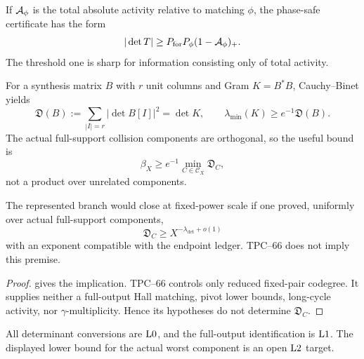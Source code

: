 If \(\mathcal A_\phi\) is the total absolute activity relative to matching
\(\phi\), the phase-safe certificate has the form
\begin{equation}
 |\det T|
 \ge
 P_{\rm for}P_\phi(1-\mathcal A_\phi)_+.
 \label{eq:tpc72-activity-certificate}
\end{equation}
The threshold one is sharp for information consisting only of total
activity.

For a synthesis matrix \(B\) with \(r\) unit columns and Gram \(K=B^*B\),
Cauchy--Binet yields
\begin{equation}
 \mathfrak D(B)
 :=
 \sum_{|I|=r}|\det B[I]|^2
 =
 \det K,
 \qquad
 \lambda_{\min}(K)\ge e^{-1}\mathfrak D(B).
 \label{eq:tpc72-determinant-gap}
\end{equation}
The actual full-support collision components are orthogonal, so the useful
bound is
\begin{equation}
 \beta_X
 \ge
 e^{-1}\min_{C\in\mathscr C_X}\mathfrak D_C,
 \label{eq:tpc72-componentwise-gap}
\end{equation}
not a product over unrelated components.

\begin{proposition}
\label{prop:represented-frontier}
The represented branch would close at fixed-power scale if one proved,
uniformly over actual full-support components,
\[
 \mathfrak D_C\ge X^{-\lambda_{\det}+o(1)}
\]
with an exponent compatible with the endpoint ledger.  TPC--66 does not
imply this premise.
\end{proposition}

\begin{proof}
 gives the implication.  TPC--66 controls
only reduced fixed-pair codegree.  It supplies neither a full-output Hall
matching, pivot lower bounds, long-cycle activity, nor
\(\gamma\)-multiplicity.  Hence its hypotheses do not determine
\(\mathfrak D_C\).
\end{proof}

All determinant conversions are \(\mathrm{L0}\), and the full-output
identification is \(\mathrm{L1}\).  The displayed lower bound for the actual
worst component is an open \(\mathrm{L2}\) target.
